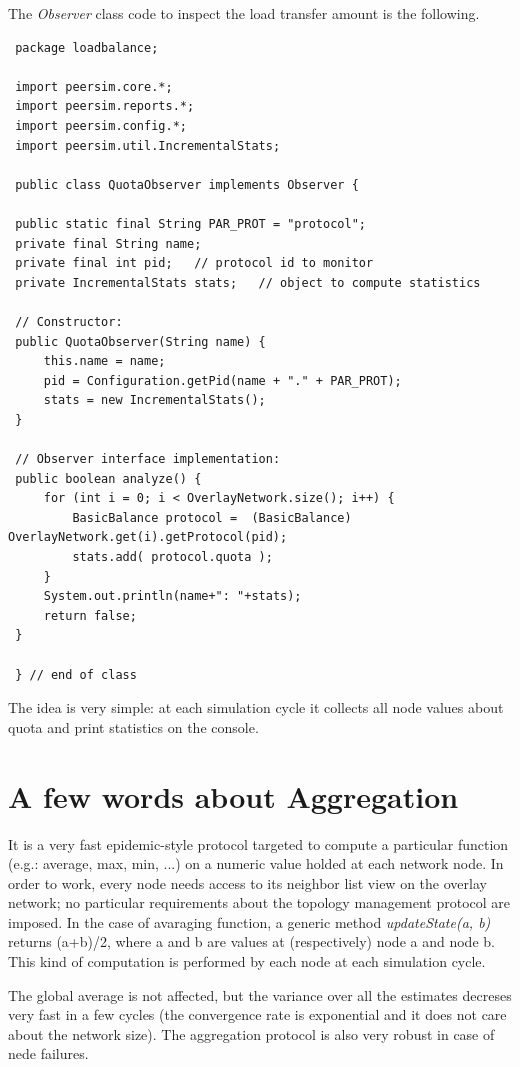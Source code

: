 \documentclass[a4paper,12pt]{article}
\begin{document}
The \emph{Observer} class code to inspect the load transfer amount
is the following. \\

\footnotesize
\begin{verbatim}
 package loadbalance;
 
 import peersim.core.*;
 import peersim.reports.*;
 import peersim.config.*;
 import peersim.util.IncrementalStats;
 
 public class QuotaObserver implements Observer {
 
 public static final String PAR_PROT = "protocol";
 private final String name;   
 private final int pid;   // protocol id to monitor
 private IncrementalStats stats;   // object to compute statistics
 
 // Constructor:
 public QuotaObserver(String name) {
     this.name = name;
     pid = Configuration.getPid(name + "." + PAR_PROT);
     stats = new IncrementalStats();
 }
 
 // Observer interface implementation:
 public boolean analyze() {
     for (int i = 0; i < OverlayNetwork.size(); i++) {
         BasicBalance protocol =  (BasicBalance) OverlayNetwork.get(i).getProtocol(pid);
         stats.add( protocol.quota );
     }
     System.out.println(name+": "+stats);
     return false;
 }
 
 } // end of class
\end{verbatim}
\normalsize


The idea is very simple: at each simulation cycle it collects all
node values about quota and print statistics on the console.


\section{\label{sec:Appendix-A-aggregation}A few words about
Aggregation}

It is a very fast epidemic-style protocol targeted to compute a particular
function (e.g.: average, max, min, ...) on a numeric value holded
at each network node. In order to work, every node needs access to
its neighbor list view on the overlay network; no particular requirements
about the topology management protocol are imposed. In the case of
avaraging function, a generic method \emph{updateState(a, b)} returns
(a+b)/2, where a and b are values at (respectively) node a and node
b. This kind of computation is performed by each node at each simulation
cycle.

The global average is not affected, but the variance over all the
estimates decreses very fast in a few cycles (the convergence rate
is exponential and it does not care about the network size). The aggregation
protocol is also very robust in case of nede failures. 
\end{document}
